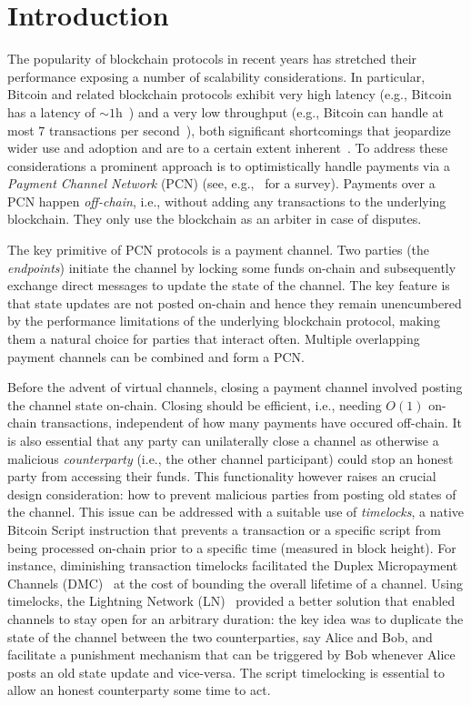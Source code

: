 \section{Introduction}
  The popularity of blockchain protocols in recent years has stretched their
  performance exposing a number of scalability considerations. In particular,
  Bitcoin and related blockchain protocols exhibit very high latency (e.g.,
  Bitcoin has a latency of $\sim$$1$h~\cite{bitcoin}) and a very low throughput (e.g.,
  Bitcoin can handle at most 7 transactions per second~\cite{scaling}), both
  significant shortcomings that jeopardize wider use and adoption and are to a
  certain extent inherent~\cite{scaling}. To address these considerations a
  prominent approach is to optimistically handle payments via a \emph{Payment
  Channel Network} (PCN) (see, e.g.,~\cite{DBLP:conf/fc/GudgeonMRMG20} for a
  survey). Payments over a PCN happen \emph{off-chain}, i.e., without adding any
  transactions to the underlying blockchain. They only use the blockchain as an
  arbiter in case of disputes.

The key primitive of PCN protocols is a payment channel. Two parties (the
\emph{endpoints}) initiate
the channel by locking some funds on-chain and subsequently exchange direct
messages to update the state of the channel. The key feature is that state
updates are not posted on-chain and hence they remain unencumbered by the
performance limitations of the underlying blockchain protocol, making them a
natural choice for parties that interact often. Multiple overlapping payment
channels can be combined and form a PCN.

Before the advent of virtual channels, closing a payment channel involved posting the channel state
on-chain. Closing should be efficient, i.e., needing $O(1)$ on-chain
transactions, independent of how many payments have occured off-chain.
It is also essential that any party can unilaterally close a channel as
otherwise a malicious \emph{counterparty} (i.e., the other channel participant) could
stop an honest party from accessing their funds. This functionality however
raises an crucial design consideration: how to prevent malicious parties from
posting old states of the channel.
%
This issue can be addressed with a suitable use of
\emph{timelocks}, a native Bitcoin Script instruction that prevents a transaction or a specific script from
being processed on-chain prior to a specific time (measured in block height).
%
For instance, diminishing transaction timelocks facilitated the Duplex
Micropayment Channels (DMC)~\cite{decker} at the cost of bounding the overall
lifetime of a channel. Using timelocks, the Lightning Network
(LN)~\cite{lightning} provided a better solution that enabled channels to stay
open for an arbitrary duration: the key idea was to duplicate the state of the
channel between the two counterparties, say Alice and Bob, and facilitate a
punishment mechanism that can be triggered by Bob whenever Alice posts an old
state update and vice-versa. The script timelocking is essential to allow an
honest counterparty some time to act.


